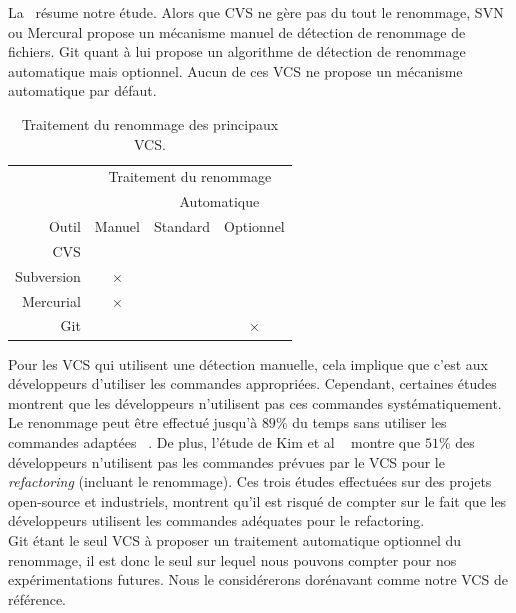La~ résume notre étude. Alors que CVS ne gère pas du tout le renommage, SVN ou Mercural propose un mécanisme manuel de détection de renommage de fichiers. Git quant à lui propose un algorithme de détection de renommage automatique mais optionnel. Aucun de ces VCS ne propose un mécanisme automatique par défaut.\\ 


\begin{table}[h]
\centering
\begin{tabular}{rccc}
\toprule
 & \multicolumn{3}{c}{Traitement du renommage}\\
\cmidrule{2-4}
& & \multicolumn{2}{c}{Automatique}\\
\cmidrule{3-4}
Outil & Manuel & Standard & Optionnel\\
\midrule
CVS & & &\\
Subversion & $\times$ & &\\
Mercurial & $\times$ & &\\
Git & & & $\times$\\
\bottomrule
\end{tabular}
\caption{Traitement du renommage des principaux VCS.}
\label{tab:vcs}
\end{table}

Pour les VCS qui utilisent une détection manuelle, cela implique que c'est aux développeurs d'utiliser les commandes appropriées. Cependant, certaines études montrent que les développeurs n'utilisent pas ces commandes systématiquement. Le renommage peut être effectué jusqu'à $89\%$ du temps sans utiliser les commandes adaptées ~\cite{lavoie_inferring_2012,steidl_incremental_2014}. De plus, l'étude de Kim et al ~\cite{kim_field_2012} montre que $51$\% des développeurs n'utilisent pas les commandes prévues par le VCS pour le \textit{refactoring} (incluant le renommage). Ces trois études effectuées sur des projets open-source et industriels, montrent qu'il est risqué de compter sur le fait que les développeurs utilisent les commandes adéquates pour le refactoring.\\

Git étant le seul VCS à proposer un traitement automatique optionnel du renommage, il est donc le seul sur lequel nous pouvons compter pour nos expérimentations futures. Nous le considérerons dorénavant comme notre VCS de référence. 

